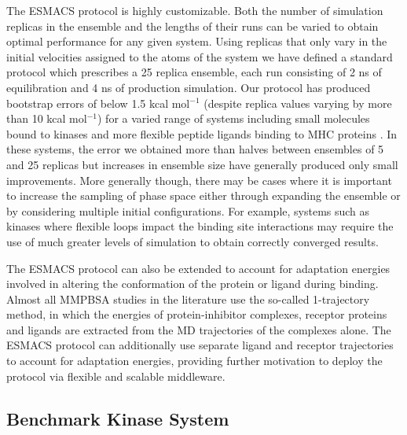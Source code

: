 \documentclass{bmcart}
\begin{document}
The ESMACS protocol is highly customizable. Both the number of simulation replicas 
in the ensemble and the lengths of their runs can be varied to
obtain optimal performance for any given system. Using replicas that only
vary in the initial velocities assigned to the atoms of the system we have
defined a standard protocol which prescribes a 25 replica ensemble, each run
consisting of 2 ns of equilibration and 4 ns of production simulation. Our
protocol has produced bootstrap errors of below 1.5 kcal mol$^{-1}$ (despite
replica values varying by more than 10 kcal mol$^{-1}$) for a varied range of
systems including small molecules bound to kinases and more flexible peptide
ligands binding to MHC proteins \cite{Wan2015, Wright2014, Wan2017brd4}.
In these systems, the error we obtained more than halves between ensembles of
5 and 25 replicas but increases in ensemble size have generally produced only
small improvements. More generally though, there may be cases where it is
important to increase the sampling of phase space either through expanding
the ensemble or by considering multiple initial configurations. 
For example, systems such as kinases where flexible loops impact the binding site interactions may require the use of much greater levels of simulation to obtain correctly converged results.

The ESMACS protocol can also be extended to account for adaptation energies
involved in altering the conformation of the protein or ligand during
binding. Almost all MMPBSA studies in the literature use the so-called
1-trajectory method, in which the energies of protein-inhibitor complexes,
receptor proteins and ligands are extracted from the MD trajectories of the
complexes alone. The ESMACS protocol can additionally use separate ligand and
receptor trajectories to account for adaptation energies, providing further
motivation to deploy the protocol via flexible and scalable middleware.

\subsection*{Benchmark Kinase System}

\end{document}

